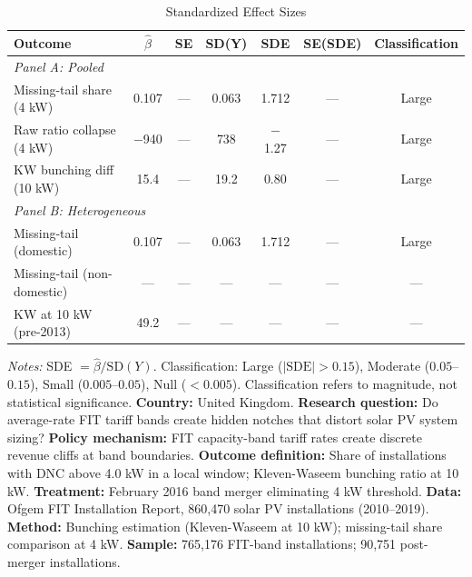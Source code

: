 \begin{table}[t]
\centering
\caption{Standardized Effect Sizes}
\label{tab:sde}
\begin{tabular}{lcccccc}
\toprule
Outcome & $\hat{\beta}$ & SE & SD(Y) & SDE & SE(SDE) & Classification \\
\midrule
\multicolumn{7}{l}{\textit{Panel A: Pooled}} \\
Missing-tail share (4 kW) & 0.107 & --- & 0.063 & 1.712 & --- & Large \\
Raw ratio collapse (4 kW) & $-$940 & --- & 738 & $-$1.27 & --- & Large \\
KW bunching diff (10 kW) & 15.4 & --- & 19.2 & 0.80 & --- & Large \\
\midrule
\multicolumn{7}{l}{\textit{Panel B: Heterogeneous}} \\
Missing-tail (domestic) & 0.107 & --- & 0.063 & 1.712 & --- & Large \\
Missing-tail (non-domestic) & --- & --- & --- & --- & --- & --- \\
KW at 10 kW (pre-2013) & 49.2 & --- & --- & --- & --- & --- \\
\bottomrule
\end{tabular}

\begin{flushleft}\small \textit{Notes:} SDE $= \hat{\beta} / \text{SD}(Y)$. Classification: Large ($|\text{SDE}| > 0.15$), Moderate ($0.05$--$0.15$), Small ($0.005$--$0.05$), Null ($< 0.005$). Classification refers to magnitude, not statistical significance. \textbf{Country:} United Kingdom. \textbf{Research question:} Do average-rate FIT tariff bands create hidden notches that distort solar PV system sizing? \textbf{Policy mechanism:} FIT capacity-band tariff rates create discrete revenue cliffs at band boundaries. \textbf{Outcome definition:} Share of installations with DNC above 4.0 kW in a local window; Kleven-Waseem bunching ratio at 10 kW. \textbf{Treatment:} February 2016 band merger eliminating 4 kW threshold. \textbf{Data:} Ofgem FIT Installation Report, 860,470 solar PV installations (2010--2019). \textbf{Method:} Bunching estimation (Kleven-Waseem at 10 kW); missing-tail share comparison at 4 kW. \textbf{Sample:} 765,176 FIT-band installations; 90,751 post-merger installations.\end{flushleft}
\end{table}
